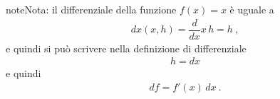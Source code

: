 \documentclass[letterpaper,10pt,italian]{jupyterBook}
\begin{document}
\begin{sphinxadmonition}{note}{Nota:}
\sphinxAtStartPar
il differenziale della funzione \(f(x) = x\) è uguale a
\begin{equation*}
\begin{split}d x(x,h) = \dfrac{d}{dx} x \, h = h \ ,\end{split}
\end{equation*}
\sphinxAtStartPar
e quindi si può scrivere nella definizione di differenziale
\begin{equation*}
\begin{split}h = dx\end{split}
\end{equation*}
\sphinxAtStartPar
e quindi
\begin{equation*}
\begin{split}d f = f'(x) \, dx \ .\end{split}
\end{equation*}\end{sphinxadmonition}
\end{document}
